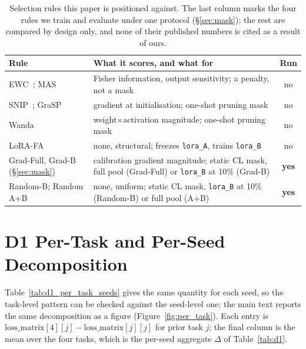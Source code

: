 \begin{table}[h]
\centering
\footnotesize
\caption{Selection rules this paper is positioned against. The last column marks the four rules we train and evaluate under one protocol (\S\ref{sec:mask}); the rest are compared by design only, and none of their published numbers is cited as a result of ours.}
\label{tab:rule_positioning}
\begin{tabular}{@{}p{}p{}c@{}}
\toprule
\textbf{Rule} & \textbf{What it scores, and what for} & \textbf{Run} \\
\midrule
EWC~\citep{kirkpatrick2017overcoming}; MAS~\citep{aljundi2018memory} & Fisher information, output sensitivity; a penalty, not a mask & no \\
SNIP~\citep{lee2019snip}; GraSP~\citep{wang2020grasp} & gradient at initialisation; one-shot pruning mask & no \\
Wanda~\citep{sun2024wanda} & weight$\times$activation magnitude; one-shot pruning mask & no \\
LoRA-FA~\citep{zhang2023lorafa} & none, structural; freezes \texttt{lora\_A}, trains \texttt{lora\_B} & no \\
Grad-Full, Grad-B (\S\ref{sec:mask}) & calibration gradient magnitude; static CL mask, full pool (Grad-Full) or \texttt{lora\_B} at 10\% (Grad-B) & \textbf{yes} \\
Random-B; Random A+B~\citep{su2024random} & none, uniform; static CL mask, \texttt{lora\_B} at 10\% (Random-B) or full pool (A+B) & \textbf{yes} \\
\bottomrule
\end{tabular}
\end{table}

\section{D1 Per-Task and Per-Seed Decomposition}
\label{app:d1_per_task}

Table~\ref{tab:d1_per_task_seeds} gives the same quantity for each
seed, so the task-level pattern can be checked against the seed-level one; the
main text reports the same decomposition as a figure (Figure~\ref{fig:per_task}). Each
entry is $\text{loss\_matrix}[4][j] - \text{loss\_matrix}[j][j]$ for prior task
$j$; the final column is the mean over the four tasks, which is the per-seed
aggregate $\Delta$ of Table~\ref{tab:d1}.

